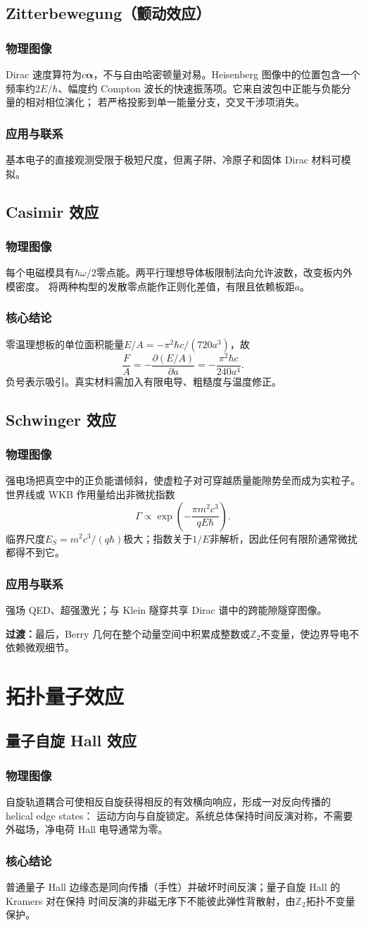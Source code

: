 \documentclass[12pt,a4paper,openany,fontset=fandol]{ctexrep}
\newcommand{\Physical}{\subsection*{物理图像}}
\newcommand{\Conclusion}{\subsection*{核心结论}}
\newcommand{\Application}{\subsection*{应用与联系}}
\newcommand{\trans}[1]{\par\medskip\noindent\textcolor{blue!55!black}{\textbf{过渡：}}#1\par\medskip}
\begin{document}
\section{Zitterbewegung（颤动效应）}
\Physical
Dirac 速度算符为$c\bm\alpha$，不与自由哈密顿量对易。Heisenberg 图像中的位置包含一个
频率约$2E/\hbar$、幅度约 Compton 波长的快速振荡项。它来自波包中正能与负能分量的相对相位演化；
若严格投影到单一能量分支，交叉干涉项消失。
\Application
基本电子的直接观测受限于极短尺度，但离子阱、冷原子和固体 Dirac 材料可模拟。

\section{Casimir 效应}
\Physical
每个电磁模具有$\hbar\omega/2$零点能。两平行理想导体板限制法向允许波数，改变板内外模密度。
将两种构型的发散零点能作正则化差值，有限且依赖板距$a$。
\Conclusion
零温理想板的单位面积能量$E/A=-\pi^2\hbar c/(720a^3)$，故
\begin{equation}\frac{F}{A}=-\frac{\partial(E/A)}{\partial a}
=-\frac{\pi^2\hbar c}{240a^4}.\end{equation}
负号表示吸引。真实材料需加入有限电导、粗糙度与温度修正。

\section{Schwinger 效应}
\Physical
强电场把真空中的正负能谱倾斜，使虚粒子对可穿越质量能隙势垒而成为实粒子。世界线或 WKB
作用量给出非微扰指数
\begin{equation}\Gamma\propto
\exp\left(-\frac{\pi m^2c^3}{qE\hbar}\right).\end{equation}
临界尺度$E_S=m^2c^3/(q\hbar)$极大；指数关于$1/E$非解析，因此任何有限阶通常微扰都得不到它。
\Application
强场 QED、超强激光；与 Klein 隧穿共享 Dirac 谱中的跨能隙隧穿图像。
\trans{最后，Berry 几何在整个动量空间中积累成整数或$\mathbb Z_2$不变量，使边界导电不依赖微观细节。}

\chapter{拓扑量子效应}
\section{量子自旋 Hall 效应}
\Physical
自旋轨道耦合可使相反自旋获得相反的有效横向响应，形成一对反向传播的 helical edge states：
运动方向与自旋锁定。系统总体保持时间反演对称，不需要外磁场，净电荷 Hall 电导通常为零。
\Conclusion
普通量子 Hall 边缘态是同向传播（手性）并破坏时间反演；量子自旋 Hall 的 Kramers 对在保持
时间反演的非磁无序下不能彼此弹性背散射，由$\mathbb Z_2$拓扑不变量保护。
\end{document}
